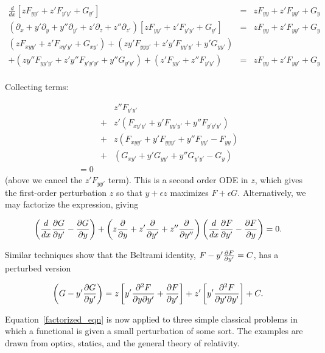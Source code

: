 \documentclass[pdflatex,sn-mathphys-num]{sn-jnl}%
\theoremstyle{thmstyleone}%
\theoremstyle{thmstyletwo}%
\theoremstyle{thmstylethree}%
\begin{document}
\begin{eqnarray}
\frac{d}{dx}\left[zF_{yy'} + z'F_{y'y'} + G_{y'}\right]
&=& zF_{yy} + z'F_{yy'} + G_{y}\nonumber\\
\left(\partial_{x} + y'\partial_{y} + y''\partial_{y'} + z'\partial_{z} + z''\partial_{z'}\right)
\left[zF_{yy'} + z'F_{y'y'} + G_{y'}\right]
&=& zF_{yy} + z'F_{yy'} + G_{y}\nonumber\\
(zF_{xyy'} + z'F_{xy'y'} + G_{xy'})
+ (zy'F_{yyy'} + z'y'F_{yy'y'} + y'G_{yy'})\nonumber\\
+ ( zy''F_{yy'y'} + z'y''F_{y'y'y'} + y''G_{y'y'})
+ (z'F_{yy'} + z''F_{y'y'})
&=& zF_{yy} + z'F_{yy'} + G_{y}\nonumber\\
\end{eqnarray}

Collecting terms:

\begin{eqnarray}
&{}& z''F_{y'y'}\nonumber\\
&+& z'(F_{xy'y'} + y'F_{yy'y'} + y''F_{y'y'y'})\nonumber\\
&+& z (F_{xyy'} + y'F_{yyy'} + y''F_{yy'}-F_{yy})\nonumber\\
&+& (G_{xy'} + y'G_{yy'} + y''G_{y'y'}- G_{y})\nonumber\\
= 0
\end{eqnarray}
%
(above we cancel the $z'F_{yy'}$ term). This is a second order ODE in
$z$, which gives the first-order perturbation $z$ so that $y+\epsilon
z$ maximizes $F+\epsilon G$.  Alternatively, we may factorize the
expression, giving

\begin{equation}\label{factorized_eqn}
\left(\frac{d}{dx}\frac{\partial{G}}{\partial{y'}} - \frac{\partial{G}}{\partial{y}}\right) + \left(z\frac{\partial{}}{\partial{y}} + z'\frac{\partial{}}{\partial{y'}} + z''\frac{\partial{}}{\partial{y''}}\right)
\left(\frac{d}{dx}\frac{\partial{F}}{\partial{y'}} - \frac{\partial{F}}{\partial{y}}\right)=0.
\end{equation}

Similar techniques show that the Beltrami identity,
$F-y'\frac{\partial{F}}{\partial{y'}}=C$, has a perturbed version

\begin{equation}\label{beltrami}
  \left(G-y'\frac{\partial{G}}{\partial{y'}}\right)
  =
    z \left[y'\frac{\partial^2F}{\partial y\partial y'} + \frac{\partial{F}}{\partial{y'}}\right]
  + z'\left[y'\frac{\partial^2F}{\partial y'\partial y'}\right] + C.
  \end{equation}
  

Equation~\ref{factorized_eqn} is now applied to three simple classical
problems in which a functional is given a small perturbation of some
sort.  The examples are drawn from optics, statics, and the general
theory of relativity.
\end{document}
